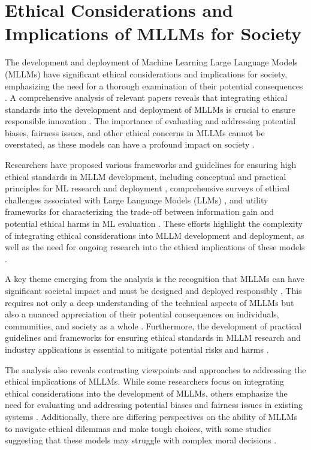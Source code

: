 \documentclass[conference]{IEEEtran}
\begin{document}
\section{Ethical Considerations and Implications of MLLMs for Society}
The development and deployment of Machine Learning Large Language Models (MLLMs) have significant ethical considerations and implications for society, emphasizing the need for a thorough examination of their potential consequences \cite{b1}. A comprehensive analysis of relevant papers reveals that integrating ethical standards into the development and deployment of MLLMs is crucial to ensure responsible innovation \cite{b2}. The importance of evaluating and addressing potential biases, fairness issues, and other ethical concerns in MLLMs cannot be overstated, as these models can have a profound impact on society \cite{b3}. 

Researchers have proposed various frameworks and guidelines for ensuring high ethical standards in MLLM development, including conceptual and practical principles for ML research and deployment \cite{b4}, comprehensive surveys of ethical challenges associated with Large Language Models (LLMs) \cite{b5}, and utility frameworks for characterizing the trade-off between information gain and potential ethical harms in ML evaluation \cite{b6}. These efforts highlight the complexity of integrating ethical considerations into MLLM development and deployment, as well as the need for ongoing research into the ethical implications of these models \cite{b7}.

A key theme emerging from the analysis is the recognition that MLLMs can have significant societal impact and must be designed and deployed responsibly \cite{b8}. This requires not only a deep understanding of the technical aspects of MLLMs but also a nuanced appreciation of their potential consequences on individuals, communities, and society as a whole \cite{b9}. Furthermore, the development of practical guidelines and frameworks for ensuring ethical standards in MLLM research and industry applications is essential to mitigate potential risks and harms \cite{b10}.

The analysis also reveals contrasting viewpoints and approaches to addressing the ethical implications of MLLMs. While some researchers focus on integrating ethical considerations into the development of MLLMs, others emphasize the need for evaluating and addressing potential biases and fairness issues in existing systems \cite{b11}. Additionally, there are differing perspectives on the ability of MLLMs to navigate ethical dilemmas and make tough choices, with some studies suggesting that these models may struggle with complex moral decisions \cite{b12}.
\end{document}
